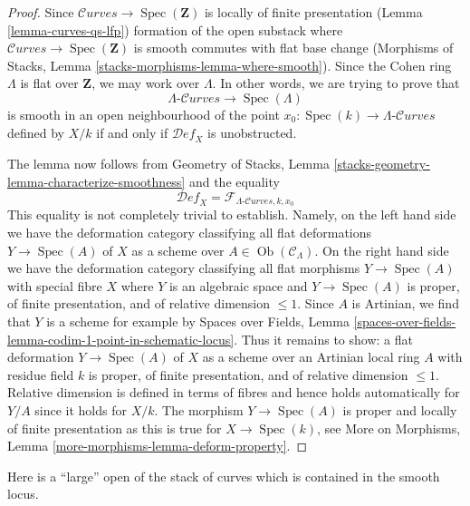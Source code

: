 \documentclass{stacks-project}
\theoremstyle{plain}
\theoremstyle{definition}
\theoremstyle{remark}
\numberwithin{equation}{subsection}
\def\Spec{\mathop{\mathrm{Spec}}}
\def\Ob{\mathop{\mathrm{Ob}}\nolimits}
\def\Curvesstack{\mathcal{C}\!\mathit{urves}}
\def\Deformationcategory{\mathcal{D}\!\mathit{ef}}
\begin{document}
\begin{proof}
Since $\Curvesstack \longrightarrow \Spec(\mathbf{Z})$ is locally
of finite presentation (Lemma \ref{lemma-curves-qs-lfp})
formation of the open substack where
$\Curvesstack \longrightarrow \Spec(\mathbf{Z})$ is smooth commutes with
flat base change
(Morphisms of Stacks, Lemma \ref{stacks-morphisms-lemma-where-smooth}).
Since the Cohen ring $\Lambda$ is flat over $\mathbf{Z}$,
we may work over $\Lambda$. In other words, we are trying to prove that
$$
\Lambda\text{-}\Curvesstack \longrightarrow \Spec(\Lambda)
$$
is smooth in an open neighbourhood of the point
$x_0 : \Spec(k) \to \Lambda\text{-}\Curvesstack$
defined by $X/k$ if and only if $\Deformationcategory_X$ is unobstructed.

\medskip\noindent
The lemma now follows from
Geometry of Stacks, Lemma \ref{stacks-geometry-lemma-characterize-smoothness}
and the equality
$$
\Deformationcategory_X =
\mathcal{F}_{\Lambda\text{-}\Curvesstack, k, x_0}
$$
This equality is not completely trivial to establish. Namely, on the left
hand side we have the deformation category classifying all flat deformations
$Y \to \Spec(A)$ of $X$ as a scheme over $A \in \Ob(\mathcal{C}_\Lambda)$.
On the right hand side we have the deformation category classifying all
flat morphisms $Y \to \Spec(A)$ with special fibre $X$
where $Y$ is an algebraic space and
$Y \to \Spec(A)$ is proper, of finite presentation, and of
relative dimension $\leq 1$. Since $A$ is Artinian, we find
that $Y$ is a scheme for example by Spaces over Fields, Lemma
\ref{spaces-over-fields-lemma-codim-1-point-in-schematic-locus}.
Thus it remains to show: a flat deformation $Y \to \Spec(A)$ of
$X$ as a scheme over an Artinian local ring $A$ with residue field $k$
is proper, of finite presentation, and of relative dimension $\leq 1$.
Relative dimension is defined in terms of fibres and hence holds
automatically for $Y/A$ since it holds for $X/k$.
The morphism $Y \to \Spec(A)$ is proper and locally of finite presentation
as this is true for $X \to \Spec(k)$, see
More on Morphisms, Lemma \ref{more-morphisms-lemma-deform-property}.
\end{proof}

\noindent
Here is a ``large'' open of the stack of curves which is contained
in the smooth locus.
\end{document}
